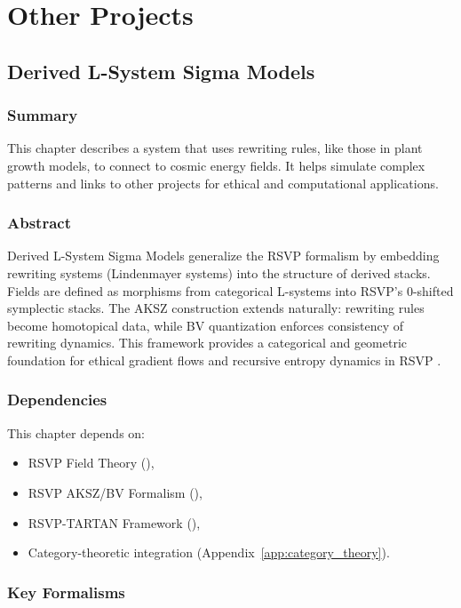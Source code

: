 \documentclass[11pt,oneside]{memoir}
\theoremstyle{plain}
\begin{document}
\part{Other Projects}

\chapter{Derived L-System Sigma Models}
\label{sec:l_system_sigma}

\section{Summary}
This chapter describes a system that uses rewriting rules, like those in plant growth models, to connect to cosmic energy fields. It helps simulate complex patterns and links to other projects for ethical and computational applications.

\section{Abstract}
Derived L-System Sigma Models generalize the RSVP formalism by embedding rewriting systems (Lindenmayer systems) into the structure of derived stacks. Fields are defined as morphisms from categorical L-systems into RSVP’s 0-shifted symplectic stacks. The AKSZ construction extends naturally: rewriting rules become homotopical data, while BV quantization enforces consistency of rewriting dynamics. This framework provides a categorical and geometric foundation for ethical gradient flows and recursive entropy dynamics in RSVP \cite{lindenmayer, aksz}.

\section{Dependencies}
This chapter depends on:
\begin{itemize}
    \item RSVP Field Theory (),
    \item RSVP AKSZ/BV Formalism (),
    \item RSVP-TARTAN Framework (),
    \item Category-theoretic integration (Appendix~\ref{app:category_theory}).
\end{itemize}

\section{Key Formalisms}
\end{document}
